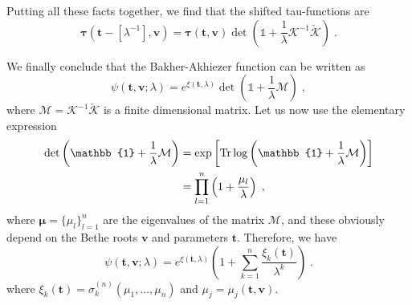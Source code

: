 \documentclass[a4paper,12pt]{amsart}
\begin{document}
Putting all these facts together, we find that the shifted
tau-functions are
\begin{equation}
  \bm{\tau}(\bm{t} - [\lambda^{-1}], \bm{v}) =
  \bm{\tau}(\bm{t}, \bm{v})
  \det \left( \mathbb{1} + \frac{1}{\lambda}
  \mathcal{K}^{-1} \check{\mathcal{K}} \right)\; .
\end{equation}

We finally conclude that the Bakher-Akhiezer function can be written as
\begin{equation}
\label{eq:ba-fredholm}
  \psi(\bm{t},\bm{v}; \lambda) = e^{\xi(\bm{t}, \lambda)}
  \det \left( \mathbb{1} + 
    \frac{1}{\lambda} \mathcal{M}
  \right)\; , 
\end{equation}
where \(\mathcal{M} = \mathcal{K}^{-1} \check{\mathcal{K}}\) is a
finite dimensional matrix. Let us now use the elementary expression
\begin{subequations}
\begin{equation}
  \begin{split}
    \det \left( \mathbb{1} + \frac{1}{\lambda} \mathcal{M}\right)
    & = \exp \left[ \Tr \log \left( \mathbb{1} + \frac{1}{\lambda} \mathcal{M} \right) \right]\\
    & = \prod_{l=1}^n \left( 1 + \frac{\mu_l}{\lambda} \right) \; ,
  \end{split}
\end{equation}
\end{subequations}
where \(\bm{\mu} = \{\mu_l\}_{l=1}^n\) are the eigenvalues of the
matrix \(\mathcal{M}\), and these obviously depend on the Bethe roots
\(\bm{v}\) and parameters \(\bm{t}\). Therefore, we have
\begin{equation}
  \psi(\bm{t},\bm{v}; \lambda) = e^{\xi(\bm{t}, \lambda)}
  \left(1 + \sum_{k=1}^n \frac{\xi_k(\bm{t})}{\lambda^k} 
  \right)\; . 
\end{equation}
where \(\xi_k(\bm{t}) = \sigma_k^{(n)}(\mu_1, \dots, \mu_n)\) and \(\mu_j = \mu_j(\bm{t}, \bm{v})\).
\end{document}

